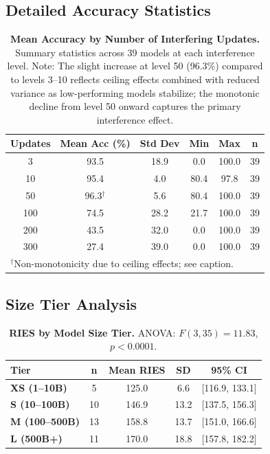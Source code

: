 \documentclass{article}
\begin{document}
\subsection{Detailed Accuracy Statistics}

\begin{table}[t]
\centering
\small
\caption{\textbf{Mean Accuracy by Number of Interfering Updates.}
Summary statistics across 39 models at each interference level. Note: The slight increase at level 50 (96.3\%) compared to levels 3--10 reflects ceiling effects combined with reduced variance as low-performing models stabilize; the monotonic decline from level 50 onward captures the primary interference effect.}
\label{tab:accuracy_by_updates_appendix}
\begin{tabular}{cccccc}
\toprule
Updates & Mean Acc (\%) & Std Dev & Min & Max & n \\
\midrule
3 & 93.5 & 18.9 & 0.0 & 100.0 & 39 \\
10 & 95.4 & 4.0 & 80.4 & 97.8 & 39 \\
50 & 96.3$^\dagger$ & 5.6 & 80.4 & 100.0 & 39 \\
100 & 74.5 & 28.2 & 21.7 & 100.0 & 39 \\
200 & 43.5 & 32.0 & 0.0 & 100.0 & 39 \\
300 & 27.4 & 39.0 & 0.0 & 100.0 & 39 \\
\bottomrule
\multicolumn{6}{l}{\footnotesize $^\dagger$Non-monotonicity due to ceiling effects; see caption.}
\end{tabular}
\end{table}

\subsection{Size Tier Analysis}

\begin{table}[t]
\centering
\small
\caption{\textbf{RIES by Model Size Tier.} ANOVA: $F(3, 35) = 11.83$, $p < 0.0001$.}
\label{tab:size_tier_appendix}
\begin{tabular}{lcccc}
\toprule
Tier & n & Mean RIES & SD & 95\% CI \\
\midrule
\textbf{XS (1--10B)} & 5 & 125.0 & 6.6 & [116.9, 133.1] \\
\textbf{S (10--100B)} & 10 & 146.9 & 13.2 & [137.5, 156.3] \\
\textbf{M (100--500B)} & 13 & 158.8 & 13.7 & [151.0, 166.6] \\
\textbf{L (500B+)} & 11 & 170.0 & 18.8 & [157.8, 182.2] \\
\bottomrule
\end{tabular}
\end{table}
\end{document}
